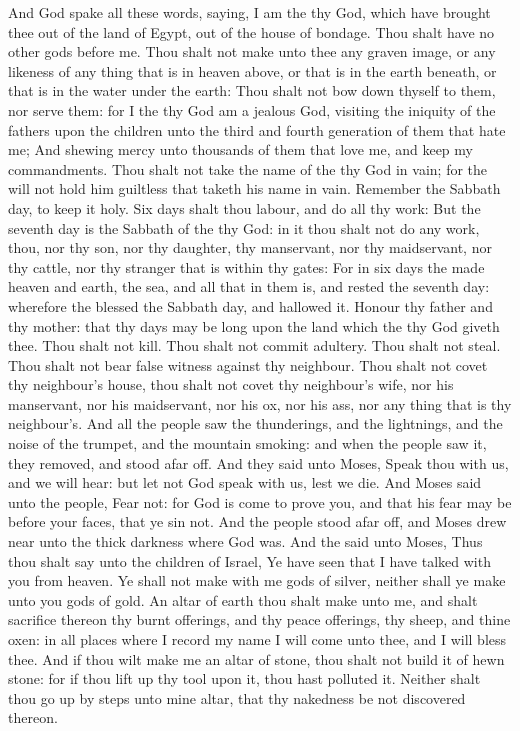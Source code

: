 \begin{biblechapter} %
 And God spake all these words, saying,
\verse I am the \LORD thy God, which have brought thee out of the land of Egypt, out of the house of bondage.
\verse Thou shalt have no other gods before me.
\verse Thou shalt not make unto thee any graven image, or any likeness of any thing that is in heaven above, or that is in the earth beneath, or that is in the water under the earth:
\verse Thou shalt not bow down thyself to them, nor serve them: for I the \LORD thy God am a jealous God, visiting the iniquity of the fathers upon the children unto the third and fourth generation of them that hate me;
\verse And shewing mercy unto thousands of them that love me, and keep my commandments.
\verse Thou shalt not take the name of the \LORD thy God in vain; for the \LORD will not hold him guiltless that taketh his name in vain.
\verse Remember the Sabbath day, to keep it holy.
\verse Six days shalt thou labour, and do all thy work:
\verse But the seventh day is the Sabbath of the \LORD thy God: in it thou shalt not do any work, thou, nor thy son, nor thy daughter, thy manservant, nor thy maidservant, nor thy cattle, nor thy stranger that is within thy gates:
\verse For in six days the \LORD made heaven and earth, the sea, and all that in them is, and rested the seventh day: wherefore the \LORD blessed the Sabbath day, and hallowed it.
\verse Honour thy father and thy mother: that thy days may be long upon the land which the \LORD thy God giveth thee.
\verse Thou shalt not kill.
\verse Thou shalt not commit adultery.
\verse Thou shalt not steal.
\verse Thou shalt not bear false witness against thy neighbour.
\verse Thou shalt not covet thy neighbour's house, thou shalt not covet thy neighbour's wife, nor his manservant, nor his maidservant, nor his ox, nor his ass, nor any thing that is thy neighbour's.
\verse And all the people saw the thunderings, and the lightnings, and the noise of the trumpet, and the mountain smoking: and when the people saw it, they removed, and stood afar off.
\verse And they said unto Moses, Speak thou with us, and we will hear: but let not God speak with us, lest we die.
\verse And Moses said unto the people, Fear not: for God is come to prove you, and that his fear may be before your faces, that ye sin not.
\verse And the people stood afar off, and Moses drew near unto the thick darkness where God was.
 And the \LORD said unto Moses, Thus thou shalt say unto the children of Israel, Ye have seen that I have talked with you from heaven.
\verse Ye shall not make with me gods of silver, neither shall ye make unto you gods of gold.
\verse An altar of earth thou shalt make unto me, and shalt sacrifice thereon thy burnt offerings, and thy peace offerings, thy sheep, and thine oxen: in all places where I record my name I will come unto thee, and I will bless thee.
\verse And if thou wilt make me an altar of stone, thou shalt not build it of hewn stone: for if thou lift up thy tool upon it, thou hast polluted it.
\verse Neither shalt thou go up by steps unto mine altar, that thy nakedness be not discovered thereon.
\end{biblechapter}

